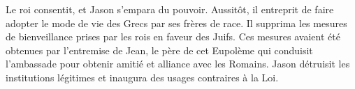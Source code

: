 Le roi consentit, et Jason s’empara du pouvoir.
Aussitôt, il entreprit de faire adopter le mode de vie des Grecs par ses frères de race.
Il supprima les mesures de bienveillance prises par les rois en faveur des Juifs.
Ces mesures avaient été obtenues par l’entremise de Jean,
	le père de cet Eupolème qui conduisit l’ambassade
		pour obtenir amitié et alliance avec les Romains.
Jason détruisit les institutions légitimes et inaugura des usages contraires à la Loi.
